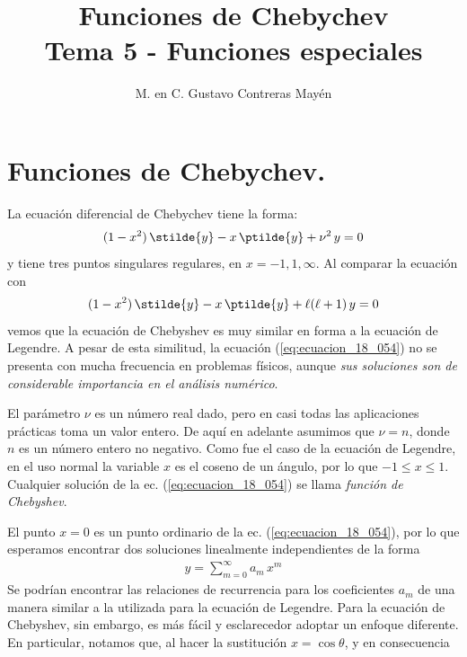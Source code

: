 
\usepackage{apacite}
\title{Funciones de Chebychev \\ \large {Tema 5 - Funciones especiales} \vspace{-3ex}}
\author{M. en C. Gustavo Contreras Mayén}
\date{ }

\vspace{-4cm}
\maketitle
\fontsize{14}{14}\selectfont
\tableofcontents
\newpage
\section{Funciones de Chebychev.}
La ecuación diferencial de Chebychev tiene la forma:
\begin{align}
(1 - x^{2}) \, \stilde{y} - x \, \ptilde{y} + \nu^{2} \, y
 = 0
 \label{eq:ecuacion_18_054}
\end{align}
y tiene tres puntos singulares regulares, en $x = -1, 1, \infty$. Al comparar la ecuación con
\begin{align*}
(1 - x^{2}) \, \stilde{y} - x \, \ptilde{y} + \ell (\ell + 1) \, y = 0
\end{align*}
vemos que la ecuación de Chebyshev es muy similar en forma a la ecuación de Legendre. A pesar de esta similitud, la ecuación (\ref{eq:ecuacion_18_054}) no se presenta con mucha frecuencia en problemas físicos, aunque \emph{sus soluciones son de considerable importancia en el análisis numérico}.
\par
El parámetro $\nu$ es un número real dado, pero en casi todas las aplicaciones prácticas toma un valor entero. De aquí en adelante asumimos que $\nu = n$, donde $n$ es un número entero no negativo. Como fue el caso de la ecuación de Legendre, en el uso normal la variable $x$ es el coseno de un ángulo, por lo que $-1 \leq x \leq 1$. Cualquier solución de la ec. (\ref{eq:ecuacion_18_054}) se llama \emph{función de Chebyshev}.
\par
El punto $x = 0$ es un punto ordinario de la ec. (\ref{eq:ecuacion_18_054}), por lo que esperamos encontrar
dos soluciones linealmente independientes de la forma
\begin{align*}
y = \sum_{m=0}^{\infty} a_{m} \, x^{m}
\end{align*}
Se podrían encontrar las relaciones de recurrencia para los coeficientes $a_{m}$ de una manera similar a la utilizada para la ecuación de Legendre. Para la ecuación de Chebyshev, sin embargo, es más fácil y esclarecedor adoptar un enfoque diferente. En particular, notamos que, al hacer la sustitución $x = \cos \theta$, y en consecuencia
